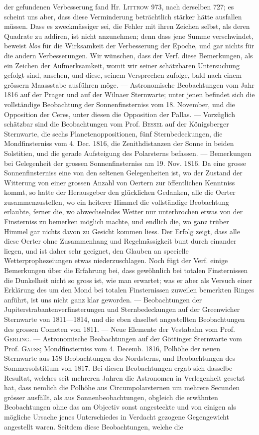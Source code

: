 \noindent der gefundenen Verbesserung fand Hr. \textsc{Littrow} 973, nach derselben 727; es scheint uns aber, dass diese Verminderung beträchtlich stärker hätte ausfallen müssen. Dass es zweckmässiger sei, die Fehler mit ihren Zeichen selbst, als deren Quadrate zu addiren, ist nicht anzunehmen; denn dass jene Summe verschwindet, beweist \emph{blos} für die Wirksamkeit der Verbesserung der Epoche, und gar nichts für die andern Verbesserungen. Wir wünschen, dass der Verf. diese Bemerkungen, als ein Zeichen der Aufmerksamkeit, womit wir seiner schätzbaren Untersuchung gefolgt sind, ansehen, und diese, seinem Versprechen zufolge, bald nach einem grössern Maassstabe ausführen möge. --- Astronomische Beobachtungen vom Jahr 1816 auf der Prager und auf der Wilnaer Sternwarte; unter jenen befindet sich die vollständige Beobachtung der Sonnenfinsterniss vom 18. November, und die Opposition der Ceres, unter diesen die Opposition der Pallas. --- Vorzüglich schätzbar sind die Beobachtungen vom Prof. \textsc{Bessel} auf der Königsberger Sternwarte, die sechs Planetenoppositionen, fünf Sternbedeckungen, die Mondfinsterniss vom 4. Dec. 1816, die Zenithdistanzen der Sonne in beiden Solstitien, und die gerade Aufsteigung des Polarsterns befassen. --- Bemerkungen bei Gelegenheit der grossen Sonnenfinsterniss am 19. Nov. 1816. Da eine grosse Sonnenfinsterniss eine von den seltenen Gelegenheiten ist, wo der Zustand der Witterung von einer grossen Anzahl von Oertern zur öffentlichen Kenntniss kommt, so hatte der Herausgeber den glücklichen Gedanken, alle die Oerter zusammenzustellen, wo ein heiterer Himmel die vollständige Beobachtung erlaubte, ferner die, wo abwechselndes Wetter nur unterbrochen etwas von der Finsterniss zu bemerken möglich machte, und endlich die, wo ganz trüber Himmel gar nichts davon zu Gesicht kommen liess. Der Erfolg zeigt, dass alle diese Oerter ohne Zusammenhang und Regelmässigkeit bunt durch einander liegen, und ist daher sehr geeignet, den Glauben an specielle Wetterprophezeiungen etwas niederzuschlagen. Noch fügt der Verf. einige Bemerkungen über die Erfahrung bei, dass gewöhnlich bei totalen Finsternissen die Dunkelheit nicht so gross ist, wie man erwartet; was er aber als Versuch einer Erklärung des um den Mond bei totalen Finsternissen zuweilen bemerkten Ringes anführt, ist uns nicht ganz klar geworden. --- Beobachtungen der Jupiterstrabantenverfinsterungen und Sternbedeckungen auf der Greenwicher Sternwarte von 1811---1814, und die eben daselbst angestellten Beobachtungen des grossen Cometen von 1811. --- Neue Elemente der Vestabahn vom Prof. \textsc{Gerling}. --- Astronomische Beobachtungen auf der Göttinger Sternwarte vom Prof. \textsc{Gauss}; Mondfinsterniss vom 4. Decemb. 1816, Polhöhe der neuen Sternwarte aus 158 Beobachtungen des Nordsterns, und Beobachtungen des Sommersolstitium von 1817. Bei diesen Beobachtungen ergab sich dasselbe Resultat, welches seit mehreren Jahren die Astronomen in Verlegenheit gesetzt hat, dass nemlich die Polhöhe aus Circumpolarsternen um mehrere Secunden grösser ausfällt, als aus Sonnenbeobachtungen, obgleich die erwähnten Beobachtungen ohne das am Objectiv sonst angesteckte und von einigen als mögliche Ursache jenes Unterschiedes in Verdacht gezogene Gegengewicht angestellt waren. Seitdem diese Beobachtungen, welche die 
